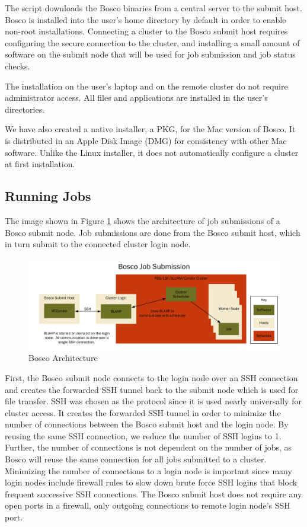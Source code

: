 The script downloads the Bosco binaries from a central server to the submit host.  Bosco is installed into the user's home directory by default in order to enable non-root installations.  Connecting a cluster to the Bosco submit host requires configuring the secure connection to the cluster, and installing a small amount of software on the submit node that will be used for job submission and job status checks.

The installation on the user's laptop and on the remote cluster do not require administrator access.  All files and applications are installed in the user's directories.

We have also created a native installer, a PKG, for the Mac version of Bosco.  It is distributed in an Apple Disk Image (DMG) for consistency with other Mac software.  Unlike the Linux installer, it does not automatically configure a cluster at first installation.


\subsection{Running Jobs}

The image shown in Figure \ref{fig:archgraph1} shows the architecture of job submissions of a Bosco submit node.  Job submissions are done from the Bosco submit host, which in turn submit to the connected cluster login node.  

\begin{figure}
\includegraphics[width=\textwidth]{images/ArchitectureGraph1}
\caption{Bosco Architecture}
\label{fig:archgraph1}
\end{figure}
\afterpage{\clearpage}

First, the Bosco submit node connects to the login node over an SSH connection and creates the forwarded SSH tunnel back to the submit node which is used for file transfer.  SSH was chosen as the protocol since it is used nearly universally for cluster access.  It creates the forwarded SSH tunnel in order to minimize the number of connections between the Bosco submit host and the login node.  By reusing the same SSH connection, we reduce the number of SSH logins to 1.  Further, the number of connections is not dependent on the number of jobs, as Bosco will reuse the same connection for all jobs submitted to a cluster.  Minimizing the number of connections to a login node is important since many login nodes include firewall rules to slow down brute force SSH logins that block frequent successive SSH connections.  The Bosco submit host does not require any open ports in a firewall, only outgoing connections to remote login node's SSH port.

